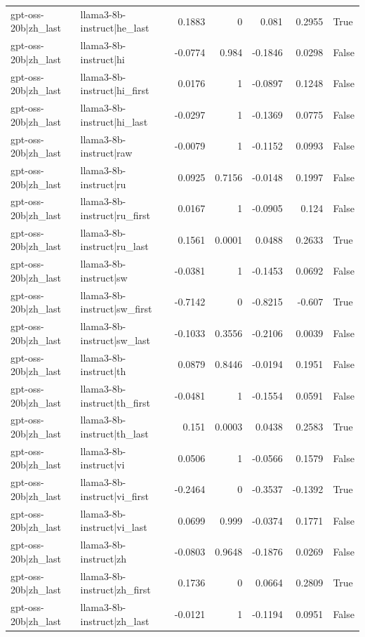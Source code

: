 \begin{table}
\begin{tabular}{l l r r r r l}
gpt-oss-20b|zh_last & llama3-8b-instruct|he_last & 0.1883 & 0 & 0.081 & 0.2955 & True \\
gpt-oss-20b|zh_last & llama3-8b-instruct|hi & -0.0774 & 0.984 & -0.1846 & 0.0298 & False \\
gpt-oss-20b|zh_last & llama3-8b-instruct|hi_first & 0.0176 & 1 & -0.0897 & 0.1248 & False \\
gpt-oss-20b|zh_last & llama3-8b-instruct|hi_last & -0.0297 & 1 & -0.1369 & 0.0775 & False \\
gpt-oss-20b|zh_last & llama3-8b-instruct|raw & -0.0079 & 1 & -0.1152 & 0.0993 & False \\
gpt-oss-20b|zh_last & llama3-8b-instruct|ru & 0.0925 & 0.7156 & -0.0148 & 0.1997 & False \\
gpt-oss-20b|zh_last & llama3-8b-instruct|ru_first & 0.0167 & 1 & -0.0905 & 0.124 & False \\
gpt-oss-20b|zh_last & llama3-8b-instruct|ru_last & 0.1561 & 0.0001 & 0.0488 & 0.2633 & True \\
gpt-oss-20b|zh_last & llama3-8b-instruct|sw & -0.0381 & 1 & -0.1453 & 0.0692 & False \\
gpt-oss-20b|zh_last & llama3-8b-instruct|sw_first & -0.7142 & 0 & -0.8215 & -0.607 & True \\
gpt-oss-20b|zh_last & llama3-8b-instruct|sw_last & -0.1033 & 0.3556 & -0.2106 & 0.0039 & False \\
gpt-oss-20b|zh_last & llama3-8b-instruct|th & 0.0879 & 0.8446 & -0.0194 & 0.1951 & False \\
gpt-oss-20b|zh_last & llama3-8b-instruct|th_first & -0.0481 & 1 & -0.1554 & 0.0591 & False \\
gpt-oss-20b|zh_last & llama3-8b-instruct|th_last & 0.151 & 0.0003 & 0.0438 & 0.2583 & True \\
gpt-oss-20b|zh_last & llama3-8b-instruct|vi & 0.0506 & 1 & -0.0566 & 0.1579 & False \\
gpt-oss-20b|zh_last & llama3-8b-instruct|vi_first & -0.2464 & 0 & -0.3537 & -0.1392 & True \\
gpt-oss-20b|zh_last & llama3-8b-instruct|vi_last & 0.0699 & 0.999 & -0.0374 & 0.1771 & False \\
gpt-oss-20b|zh_last & llama3-8b-instruct|zh & -0.0803 & 0.9648 & -0.1876 & 0.0269 & False \\
gpt-oss-20b|zh_last & llama3-8b-instruct|zh_first & 0.1736 & 0 & 0.0664 & 0.2809 & True \\
gpt-oss-20b|zh_last & llama3-8b-instruct|zh_last & -0.0121 & 1 & -0.1194 & 0.0951 & False \\

\end{tabular}
\end{table}
